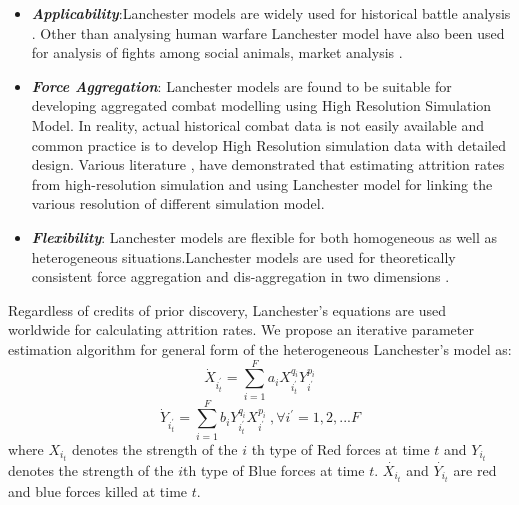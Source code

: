\documentclass[]{article}
\begin{document}
\begin{itemize}
  \item \textbf{\textit{Applicability}}:Lanchester models are widely used for historical battle analysis \autocite{Engel:1954}. Other than analysing human warfare Lanchester model have also been used for analysis of fights among social animals, market analysis \autocite{remnet:2016}.
  \item \textbf{\textit{Force Aggregation}}: Lanchester models are found to be suitable for developing aggregated combat modelling using High Resolution Simulation Model. In reality, actual historical combat data is not easily available and common practice is to develop High Resolution simulation data with detailed design. Various literature \autocite{Brackney:1959}, \autocite{Das:2007} \autocite{Das:2015} have demonstrated that estimating attrition rates from high-resolution simulation and using Lanchester model for linking the various resolution of different simulation model.
  \item \textbf{\textit{Flexibility}}: Lanchester models are flexible for both homogeneous as well as heterogeneous situations.Lanchester models are used for theoretically consistent force aggregation and dis-aggregation in two dimensions \autocite{Taylor:1983,Hillestad:1995}.
\end{itemize}
Regardless of credits of prior discovery, Lanchester's equations are used worldwide for calculating attrition rates. We propose an iterative parameter estimation algorithm for general form of the heterogeneous Lanchester's model as:
\begin{equation} 
      \Dot{X}_{i_{t}^{'}}=\sum_{i=1}^F a_{i}X_{i_{t}^{'}}^{q_{i}}Y_{i_{}^{'}}^{p_{i}}
\end{equation}
\begin{equation}
     \Dot{Y}_{i_{t}^{'}}=\sum_{i=1}^F b_{i}Y_{i_{t}^{'}}^{q_{i}}X_{i_{}^{'}}^{p_{i}}\ ,\forall{i^{'}}=1,2,...F
\end{equation}
where  $X_{{i}_{t}}$ denotes the strength of the $i$ th type of Red forces at time $t$ and  $Y_{{i}_{t}}$ denotes the strength of the $i$th type of Blue forces at time $t$. $\Dot{X_{{i}_{t}}}$ and $\Dot{Y_{{i}_{t}}}$ are red and blue forces killed at time $t$.
\end{document}
